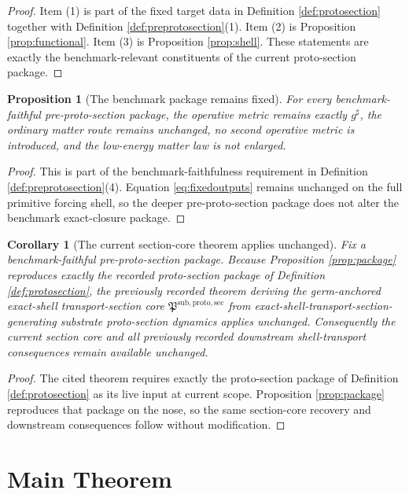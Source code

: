 \documentclass[11pt]{article}
\newcommand{\CompletedMetric}{g^{\sharp}}
\newcommand{\ProtoSectionCore}{\mathfrak P^{\mathrm{sub,proto,sec}}}
\newtheorem{proposition}{Proposition}
\newtheorem{corollary}{Corollary}
\begin{document}
\begin{proof}
Item (1) is part of the fixed target data in Definition \ref{def:protosection} together with Definition \ref{def:preprotosection}(1). Item (2) is Proposition \ref{prop:functional}. Item (3) is Proposition \ref{prop:shell}. These statements are exactly the benchmark-relevant constituents of the current proto-section package.
\end{proof}

\begin{proposition}[The benchmark package remains fixed]
\label{prop:boundary}
For every benchmark-faithful pre-proto-section package, the operative metric remains exactly \(\CompletedMetric\), the ordinary matter route remains unchanged, no second operative metric is introduced, and the low-energy matter law is not enlarged.
\end{proposition}

\begin{proof}
This is part of the benchmark-faithfulness requirement in Definition \ref{def:preprotosection}(4). Equation \eqref{eq:fixedoutputs} remains unchanged on the full primitive forcing shell, so the deeper pre-proto-section package does not alter the benchmark exact-closure package.
\end{proof}

\begin{corollary}[The current section-core theorem applies unchanged]
\label{cor:section}
Fix a benchmark-faithful pre-proto-section package. Because Proposition \ref{prop:package} reproduces exactly the recorded proto-section package of Definition \ref{def:protosection}, the previously recorded theorem deriving the germ-anchored exact-shell transport-section core \(\ProtoSectionCore\) from exact-shell-transport-section-generating substrate proto-section dynamics applies unchanged. Consequently the current section core and all previously recorded downstream shell-transport consequences remain available unchanged.
\end{corollary}

\begin{proof}
The cited theorem requires exactly the proto-section package of Definition \ref{def:protosection} as its live input at current scope. Proposition \ref{prop:package} reproduces that package on the nose, so the same section-core recovery and downstream consequences follow without modification.
\end{proof}

\section{Main Theorem}
\end{document}
